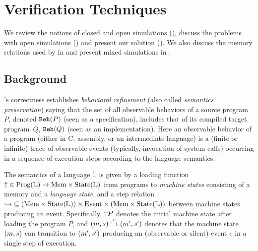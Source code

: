 \section{Verification Techniques}
\label{sec:overview-verification}

We review the notions of closed and open simulations
(), discuss the problems
with open simulations
() and present our solution
().
We also discuss the memory relations used by \ccm{} in 
and present mixed simulations in .

\subsection{Background}
\label{sec:overview-verification:background}


\cc{}'s correctness establishes \emph{behavioral refinement}
(also called \emph{semantics preservation}) saying that
the set of all observable behaviors of a source program~$P$, denoted $\mathtt{Beh}({P})$ (seen as a specification),
includes that of its compiled target program~$Q$, \ie $\mathtt{Beh}({Q})$ (seen as an implementation).
Here an observable behavior of a program (either in C, assembly, or an
intermediate language) is a (finite or infinite) trace of observable events
(typically, invocation of system calls) occurring in a sequence of execution steps according to the language semantics.

The semantics of a language $\mathbb{L}$ is given by a loading
function ${{\uparrow}} \in \textrm{Prog}(\mathbb{L}) \to \textrm{Mem}\times\textrm{State}(\mathbb{L})$
from programs to \emph{machine states} consisting of a memory and a \emph{language state},
and a step relation
${\hookrightarrow} \subseteq { (\textrm{Mem}\times\textrm{State}(\mathbb{L})) \times \textrm{Event}\times (\textrm{Mem}\times\textrm{State}(\mathbb{L}))}$
between machine states producing an event.
Specifically, ${\uparrow}{P}$ denotes the initial machine state after loading the program $P$, and
$(m,s) \stackrel{e}{\hookrightarrow} (m',s')$ denotes that the machine state $(m,s)$ can transition to
$(m',s')$ producing an (observable or silent) event $e$ in a single step of
execution.

